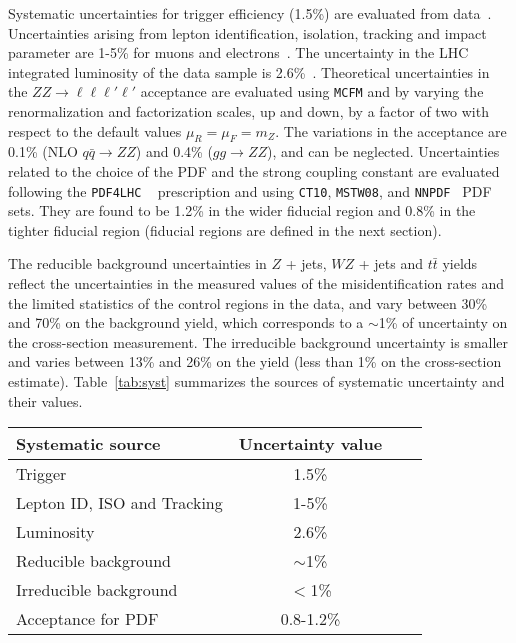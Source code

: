 \label{sec:systunc}
Systematic uncertainties for trigger efficiency (1.5\%) are evaluated from data~\cite{ZZXSPaper}. Uncertainties
arising from lepton identification, isolation, tracking and impact parameter are 1-5\% for muons and electrons~\cite{ZZXSPaper}. The uncertainty in the LHC integrated
luminosity of the data sample is 2.6\%~\cite{CMS-PAS-LUM-13-001}. Theoretical uncertainties in the $ZZ \to \ell\ell\ell'\ell'$ 
acceptance are evaluated using \texttt{MCFM} and by varying the renormalization and factorization scales, up and down, 
by a factor of two with respect to the default values $\mu_R = \mu_F = m_Z$. The variations in the acceptance are 0.1\% (NLO
$q\bar{q} \to ZZ$) and 0.4\% ($gg \to ZZ$), and can be neglected. Uncertainties related to the choice
of the PDF and the strong coupling constant are evaluated following the \texttt{PDF4LHC} ~\cite{PDF4LHCRec, PDF4LHCRep, CT10} prescription and 
using \texttt{CT10},  \texttt{MSTW08}, and  \texttt{NNPDF}~\cite{NNPDF} PDF sets. They are found to be 1.2\% in the wider fiducial region and 0.8\% in the tighter fiducial region (fiducial regions are defined in the next section).

The reducible background uncertainties in $Z$ + jets, $WZ$ + jets and $t\bar{t}$ yields reflect the uncertainties in the measured values of the misidentification rates and the limited statistics of the control regions in the data, and vary between 30\% and 70\% on the background yield, which corresponds to a $\sim$1\% of uncertainty on the cross-section measurement. The irreducible background uncertainty is smaller and varies between 13\% and 26\% on the yield (less than 1\% on the cross-section estimate). Table~\ref{tab:syst} summarizes the sources  of systematic uncertainty and their values.

\begin{table*}[htbH]
\begin{center}
\begin{tabular}{lclc}
\hline Systematic source & Uncertainty value\\
\hline Trigger & 1.5\%  \\
Lepton ID, ISO and Tracking & 1-5\%\\
Luminosity & 2.6\%\\
Reducible background & $\sim$1\%\\
Irreducible background & $<$1\%\\
Acceptance for PDF & 0.8-1.2\%\\
\hline
\end{tabular}
\end{center}
\end{table*}


